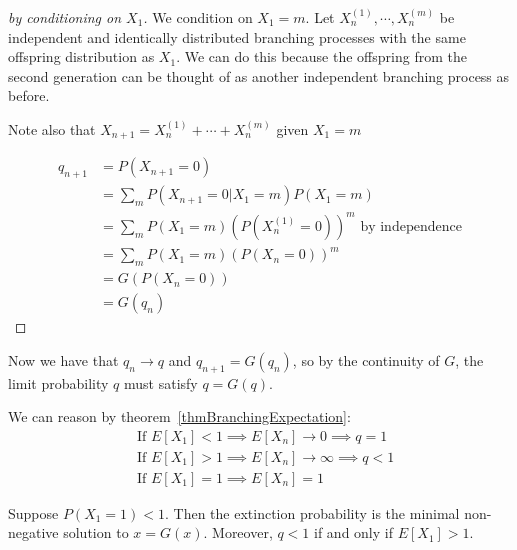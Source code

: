 \documentclass[../Main.tex]{subfiles}
\begin{document}
\begin{proof}[by conditioning on $X_1$]
    We condition on $X_1 = m$. Let $X_n^{(1)}, \cdots, X_n^{(m)}$ be independent and identically distributed branching processes with the same offspring distribution as $X_1$. We can do this because the offspring from the second generation can be thought of as another independent branching process as before.\par
    Note also that $X_{n + 1} = X_n^{(1)} + \cdots + X_n^{(m)}$ given $X_1 = m$\par
    \begin{align*}
        q_{n + 1} &= P(X_{n + 1} = 0) \\
        &= \sum_m P(X_{n + 1} = 0 | X_1 = m)P(X_1 = m) \\
        &= \sum_m P(X_1 = m) \left(P(X_n^{(1)} = 0)\right)^m \text{ by independence} \\
        &= \sum_m P(X_1 = m) \left(P(X_n = 0)\right)^m \\
        &= G(P(X_n = 0)) \\
        &= G(q_n)
    \end{align*}
\end{proof}
Now we have that $q_n \to q$ and $q_{n + 1} = G(q_n)$, so by the continuity of $G$, the limit probability $q$ must satisfy $q = G(q)$.\par
We can reason by theorem~\ref{thmBranchingExpectation}:
\begin{align*}
    &\text{If } E[X_1] < 1 \implies E[X_n] \to 0 \implies q = 1 \\
    &\text{If } E[X_1] > 1 \implies E[X_n] \to \infty \implies q < 1 \\
    &\text{If } E[X_1] = 1 \implies E[X_n] = 1
\end{align*}
\begin{theorem}
    Suppose $P(X_1 = 1) < 1$. Then the extinction probability is the minimal non-negative solution to $x = G(x)$. Moreover, $q < 1$ if and only if $E[X_1] > 1$.
    \label{thmExtinctionProb}
\end{theorem}
\end{document}
